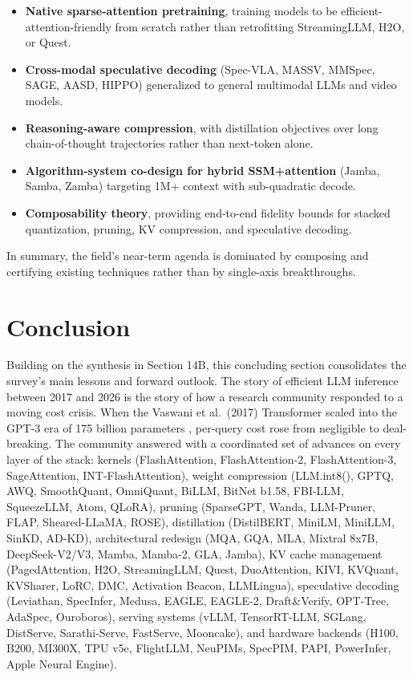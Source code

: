 \documentclass{article}
\begin{document}
\begin{itemize}

\item
  \textbf{Native sparse-attention pretraining}, training models to be efficient-attention-friendly from scratch rather than retrofitting StreamingLLM, H2O, or Quest.
\item
  \textbf{Cross-modal speculative decoding} (Spec-VLA, MASSV, MMSpec, SAGE, AASD, HIPPO) generalized to general multimodal LLMs and video models.
\item
  \textbf{Reasoning-aware compression}, with distillation objectives over long chain-of-thought trajectories rather than next-token alone.
\item
  \textbf{Algorithm-system co-design for hybrid SSM+attention} (Jamba, Samba, Zamba) targeting 1M+ context with sub-quadratic decode.
\item
  \textbf{Composability theory}, providing end-to-end fidelity bounds for stacked quantization, pruning, KV compression, and speculative decoding.
\end{itemize}

In summary, the field's near-term agenda is dominated by composing and certifying existing techniques rather than by single-axis breakthroughs.

\section{Conclusion}\label{conclusion}

Building on the synthesis in Section 14B, this concluding section consolidates the survey's main lessons and forward outlook. The story of efficient LLM inference between 2017 and 2026 is the story of how a research community responded to a moving cost crisis. When the Vaswani et al.~(2017) Transformer scaled into the GPT-3 era of 175 billion parameters \citep{brown20202020}, per-query cost rose from negligible to deal-breaking. The community answered with a coordinated set of advances on every layer of the stack: kernels (FlashAttention, FlashAttention-2, FlashAttention-3, SageAttention, INT-FlashAttention), weight compression (LLM.int8(), GPTQ, AWQ, SmoothQuant, OmniQuant, BiLLM, BitNet b1.58, FBI-LLM, SqueezeLLM, Atom, QLoRA), pruning (SparseGPT, Wanda, LLM-Pruner, FLAP, Sheared-LLaMA, ROSE), distillation (DistilBERT, MiniLM, MiniLLM, SinKD, AD-KD), architectural redesign (MQA, GQA, MLA, Mixtral 8x7B, DeepSeek-V2/V3, Mamba, Mamba-2, GLA, Jamba), KV cache management (PagedAttention, H2O, StreamingLLM, Quest, DuoAttention, KIVI, KVQuant, KVSharer, LoRC, DMC, Activation Beacon, LLMLingua), speculative decoding (Leviathan, SpecInfer, Medusa, EAGLE, EAGLE-2, Draft\&Verify, OPT-Tree, AdaSpec, Ouroboros), serving systems (vLLM, TensorRT-LLM, SGLang, DistServe, Sarathi-Serve, FastServe, Mooncake), and hardware backends (H100, B200, MI300X, TPU v5e, FlightLLM, NeuPIMs, SpecPIM, PAPI, PowerInfer, Apple Neural Engine).
\end{document}
